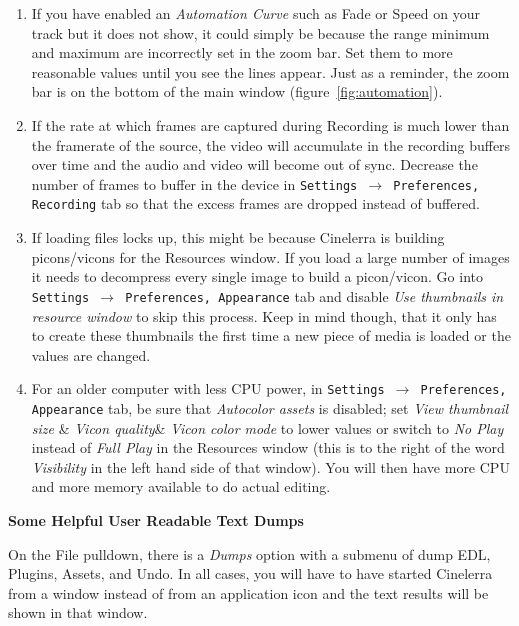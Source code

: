 \begin{enumerate}
        \item If you have enabled an \textit{Automation Curve} such as Fade or Speed on your track but it
does not show, it could simply be because the range minimum and maximum are incorrectly set in the zoom bar.
Set them to more reasonable values until you see the lines appear. Just as a reminder, the zoom bar is on the
bottom of the main window (figure~\ref{fig:automation}). 
 	\item If the rate at which frames are captured during Recording is much lower than the framerate of the source, the video will accumulate in the recording buffers over time and the audio and video will become out of sync. Decrease the number of frames to buffer in the device in \texttt{Settings $\rightarrow $ Preferences, Recording} tab so that the excess frames are dropped instead of buffered.
	\item If loading files locks up, this might be because Cinelerra is building picons/vicons for the Resources window. If you load a large number of images it needs to decompress every single image to build a picon/vicon. Go into \texttt{Settings $\rightarrow$ Preferences, Appearance} tab and disable \textit{Use thumbnails in resource window} to skip this process. Keep in mind though, that it only has to create these thumbnails the first time a new piece of media is loaded or the values are changed.
	\item For an older computer with less CPU power, in \texttt{Settings $\rightarrow$ Preferences, Appearance} tab, be sure that \textit{Autocolor assets }is disabled; set \textit{View thumbnail size} \& \textit{Vicon quality}\& \textit{Vicon color mode} to lower values or switch to \textit{No Play} instead of \textit{Full Play} in the Resources window (this is to the right of the word \textit{Visibility} in the left hand side of that window). You will then have more CPU and more memory available to do actual editing.
\end{enumerate}

\textbf{Some Helpful User Readable Text Dumps}

On the File pulldown, there is a \textit{Dumps} option with a submenu of dump EDL, Plugins, Assets, and Undo. In all cases, you will have to have started Cinelerra from a window instead of from an application icon and
the text results will be shown in that window.


